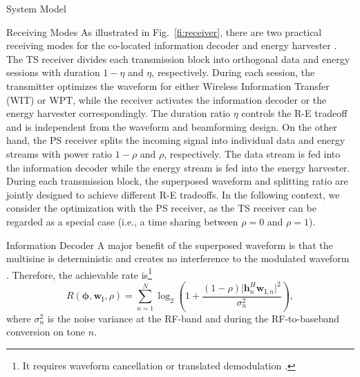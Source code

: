 \documentclass[journal]{IEEEtran}
\begin{document}
\begin{section}{System Model}
\begin{subsection}{Receiving Modes}
			As illustrated in Fig.~\ref{fi:receiver}, there are two practical receiving modes for the co-located information decoder and energy harvester \cite{Zhou2013}. The TS receiver divides each transmission block into orthogonal data and energy sessions with duration $1-\eta$ and $\eta$, respectively. During each session, the transmitter optimizes the waveform for either Wireless Information Transfer (WIT) or WPT, while the receiver activates the information decoder or the energy harvester correspondingly. The duration ratio $\eta$ controls the R-E tradeoff and is independent from the waveform and beamforming design. On the other hand, the PS receiver splits the incoming signal into individual data and energy streams with power ratio $1-\rho$ and $\rho$, respectively. The data stream is fed into the information decoder while the energy stream is fed into the energy harvester. During each transmission block, the superposed waveform and splitting ratio are jointly designed to achieve different R-E tradeoffs. In the following context, we consider the optimization with the PS receiver, as the TS receiver can be regarded as a special case (i.e., a time sharing between $\rho=0$ and $\rho=1$).
		\end{subsection}


		\begin{subsection}{Information Decoder}
			A major benefit of the superposed waveform is that the multisine is deterministic and creates no interference to the modulated waveform \cite{Clerckx2018b}. Therefore, the achievable rate is\footnote{It requires waveform cancellation or translated demodulation \cite{Clerckx2018b}.}
			\begin{equation}\label{eq:R}
				R(\boldsymbol{\phi},\boldsymbol{w}_{\mathrm{I}},\rho) = \sum_{n=1}^N{\log_2\left(1+\frac{(1-\rho)\lvert \boldsymbol{h}_{n}^H\boldsymbol{w}_{\mathrm{I},n} \rvert^2}{\sigma_n^2}\right)},
			\end{equation}
			where $\sigma_n^2$ is the noise variance at the RF-band and during the RF-to-baseband conversion on tone $n$.
		\end{subsection}



\end{section}
\end{document}
